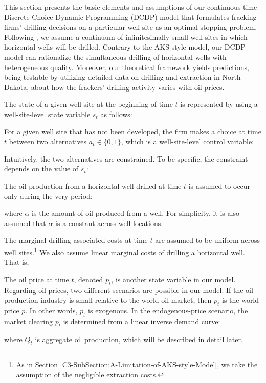 This section presents the basic elements and assumptions of our continuous-time Discrete Choice Dynamic Programming (DCDP) model that formulates fracking firms' drilling decisions on a particular well site as an optimal stopping problem. Following \cite{Hotelling-under-Pressure_AKS_2018}, we assume a continuum of infinitesimally small well sites in which horizontal wells will be drilled. Contrary to the AKS-style model, our DCDP model can rationalize the simultaneous drilling of horizontal wells with heterogeneous quality. Moreover, our theoretical framework yields predictions, being testable by utilizing detailed data on drilling and extraction in North Dakota, about how the frackers' drilling activity varies with oil prices. 

The state of a given well site at the beginning of time $t$ is represented by using a well-site-level state variable $s_{t}$ as follows:


For a given well site that has not been developed, the firm makes a choice at time $t$ between two alternatives $a_{t} \in \{ 0, 1 \}$, which is a well-site-level control variable:

Intuitively, the two alternatives are constrained. To be specific, the constraint depends on the value of $s_{t}$:


The oil production from a horizontal well drilled at time $t$ is assumed to occur only during the very period:

where $\alpha$ is the amount of oil produced from a well. For simplicity, it is also assumed that $\alpha$ is a constant across well locations.

The marginal drilling-associated costs at time $t$ are assumed to be uniform across well sites.\footnote{As in Section \ref{C3-SubSection:A-Limitation-of-AKS-style-Model}, we take the assumption of the negligible extraction costs.} We also assume linear marginal costs of drilling a horizontal well. That is, 


The oil price at time $t$, denoted $p_{t}$, is another state variable in our model. Regarding oil prices, two different scenarios are possible in our model. If the oil production industry is small relative to the world oil market, then $p_{t}$ is the world price $\bar{p}$. In other words, $p_{t}$ is exogenous. In the endogenous-price scenario, the market clearing $p_{t}$ is determined from a linear inverse demand curve:

where $Q_{t}$ is aggregate oil production, which will be described in detail later. 

